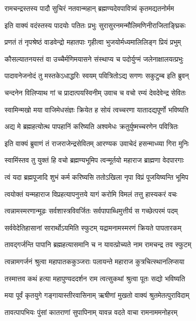 \twolineshloka
{रामचन्द्रस्तस्य पादौ सुचिरं नतवान्महान्}
{ब्रह्मण्यदेवपावित्र्यं कृतमद्यतनोर्मम}%

\twolineshloka
{इति वाक्यं वदंस्तस्य पादयोः पतितः प्रभुः}
{सुरासुरनमन्मौलिमणिनीराजिताङ्घ्रिकः}%

\twolineshloka
{प्रणतं तं नृपश्रेष्ठं वाडवेन्द्रो महातपाः}
{गृहीत्वा भुजयोर्मध्यमालिलिङ्ग प्रियं प्रभुम्}%

\twolineshloka
{कौसल्यातनयस्तं वा उच्चैर्मणिमयासने}
{संस्थाप्य च पदोर्युग्मं जलेनाक्षालयत्प्रभुः}%

\twolineshloka
{पादावनेजनोदं तु मस्तकेऽधाद्धरिः स्वयम्}
{पवित्रितोऽद्य सगणः सकुटुम्ब इति ब्रुवन्}%

\twolineshloka
{चन्दनेन विलिप्याथ गां च प्रादात्पयस्विनीम्}
{उवाच च वचो रम्यं देवदेवेन्द्र सेवितः}%

\twolineshloka
{स्वामिन्मखो मया वाजिमेधसंज्ञः क्रियेत ह}
{सोयं त्वच्चरणा यातादद्यपूर्णो भविष्यति}%

\twolineshloka
{अद्य मे ब्रह्महत्योत्थ पापहानिं करिष्यति}
{अश्वमेधः क्रतुर्युष्मच्चरणेन पवित्रितः}%

\twolineshloka
{इति वाक्यं ब्रुवाणं तं राजराजेन्द्रसेवितम्}
{आरण्यक उवाचेदं हसन्माध्व्या गिरा मुनिः}%

\twolineshloka
{स्वामिंस्तव तु युक्तं हि वचो ब्रह्मण्यभूमिप}
{त्वन्मूर्तयो महाराज ब्राह्मणा वेदपारगाः}%

\twolineshloka
{त्वं यदा ब्रह्मपूजादि शुभं कर्म करिष्यसि}
{ततोऽखिला नृपा विप्रं पूजयिष्यन्ति भूमिप}%

\twolineshloka
{त्वयोक्तं यन्महाराज विप्रहत्यापनुत्तये}
{यागं करोमि विमलं तत्तु हास्यकरं वचः}%

\twolineshloka
{त्वन्नामस्मरणान्मूढः सर्वशास्त्रविवर्जितः}
{सर्वपापाब्धिमुत्तीर्य स गच्छेत्परमं पदम्}%

\twolineshloka
{सर्ववेदेतिहासानां सारार्थोऽयमिति स्फुटम्}
{यद्रामनामस्मरणं क्रियते पापतारकम्}%

\twolineshloka
{तावद्गर्जन्ति पापानि ब्रह्महत्यासमानि च}
{न यावत्प्रोच्यते नाम रामचन्द्र तव स्फुटम्}%

\twolineshloka
{त्वन्नामगर्जनं श्रुत्वा महापातककुञ्जराः}
{पलायन्ते महाराज कुत्रचित्स्थानलिप्सया}%

\twolineshloka
{तस्मात्तव कथं हत्या महापुण्यददर्शन}
{राम त्वत्सुकथां श्रुत्वा पूतः सद्यो भविष्यति}%

\twolineshloka
{मया पूर्वं कृतयुगे गङ्गायास्तीरवासिनाम्}
{ऋषीणां मुखतो वाक्यं श्रुतमेतत्पुराविदाम्}%

\twolineshloka
{तावत्पापभियः पुंसां कातराणां सुपापिनाम्}
{यावन्न वदते वाचा रामनाममनोहरम्}%

